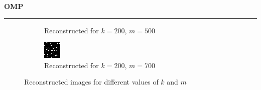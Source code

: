 \documentclass[a4paper,12pt]{article}
\newenvironment{solution}[2][]{%
    \begin{mdframed}[linecolor=blue!70!black, linewidth=2pt, roundcorner=10pt, backgroundcolor=yellow!10!white, skipabove=12pt, skipbelow=12pt]%
        \textbf{\large #2}
        \par\noindent\rule{\textwidth}{0.4pt}
}{
    \end{mdframed}
}
\begin{document}
\begin{solution}{OMP}
\begin{figure}[H]
\begin{subfigure}[t]{0.32\textwidth}
      \caption{Reconstructed for $k = 200$, $m = 500$}
  \end{subfigure}
  \begin{subfigure}[t]{0.32\textwidth}
      \centering
      \includegraphics[width=\textwidth]{../images/omp/Reconstructed_k_200_m_700.png}
      \caption{Reconstructed for $k = 200$, $m = 700$}
  \end{subfigure}

  \caption{Reconstructed images for different values of $k$ and $m$}
  \label{fig:reconstructed_all}
\end{figure}








\end{solution}
\end{document}
